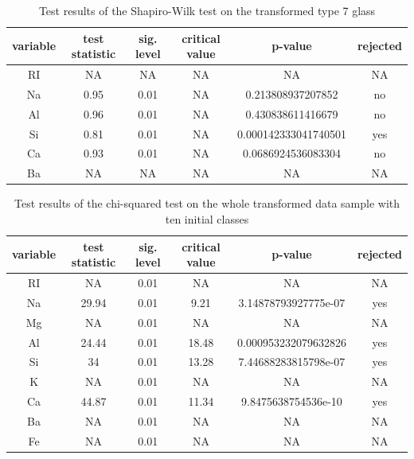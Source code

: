 \documentclass[a4paper, 12pt, titlepage, headsepline, listof = totoc, bibliography = totoc, numbers = noenddot]{scrartcl}
\begin{document}
\begin{appendix}
\begin{table}[h!]
\centering
\begin{tabular}{|cccccc|} \hline variable & test statistic & sig. level & critical value & p-value & rejected\\ \hline RI & NA & NA & NA & NA & NA\\ 
Na & 0.95 & 0.01 & NA & 0.213808937207852 & no\\ 
Al & 0.96 & 0.01 & NA & 0.430838611416679 & no\\ 
Si & 0.81 & 0.01 & NA & 0.000142333041740501 & yes\\ 
Ca & 0.93 & 0.01 & NA & 0.0686924536083304 & no\\ 
Ba & NA & NA & NA & NA & NA\\ \hline \end{tabular}\caption{Test results of the Shapiro-Wilk test on the transformed type 7 glass}
\label{tab:testrestype7SWtrans}
\end{table}

\begin{table}[h!]
\centering
\begin{tabular}{|cccccc|} \hline variable & test statistic & sig. level & critical value & p-value & rejected\\ \hline RI & NA & 0.01 & NA & NA & NA\\ 
Na & 29.94 & 0.01 & 9.21 & 3.14878793927775e-07 & yes\\ 
Mg & NA & 0.01 & NA & NA & NA\\ 
Al & 24.44 & 0.01 & 18.48 & 0.000953232079632826 & yes\\ 
Si & 34 & 0.01 & 13.28 & 7.44688283815798e-07 & yes\\ 
K & NA & 0.01 & NA & NA & NA\\ 
Ca & 44.87 & 0.01 & 11.34 & 9.8475638754536e-10 & yes\\ 
Ba & NA & 0.01 & NA & NA & NA\\ 
Fe & NA & 0.01 & NA & NA & NA\\ \hline \end{tabular}\caption{Test results of the chi-squared test on the whole transformed data sample with ten initial classes}
\label{tab:chi-full-trans}
\end{table}


\end{appendix}
\end{document}
